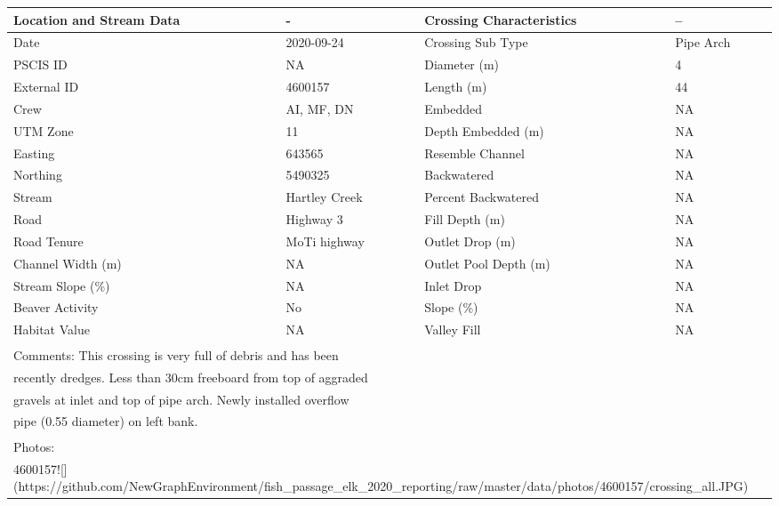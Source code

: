 \documentclass[
]{book}
\begin{document}
\begin{tabular}{l|l|l|l}
\hline
Location and Stream Data & - & Crossing Characteristics & --\\
\hline
Date & 2020-09-24 & Crossing Sub Type & Pipe Arch\\
\hline
PSCIS ID & NA & Diameter (m) & 4\\
\hline
External ID & 4600157 & Length (m) & 44\\
\hline
Crew & AI, MF, DN & Embedded & NA\\
\hline
UTM Zone & 11 & Depth Embedded (m) & NA\\
\hline
Easting & 643565 & Resemble Channel & NA\\
\hline
Northing & 5490325 & Backwatered & NA\\
\hline
Stream & Hartley Creek & Percent Backwatered & NA\\
\hline
Road & Highway 3 & Fill Depth (m) & NA\\
\hline
Road Tenure & MoTi highway & Outlet Drop (m) & NA\\
\hline
Channel Width (m) & NA & Outlet Pool Depth (m) & NA\\
\hline
Stream Slope (\%) & NA & Inlet Drop & NA\\
\hline
Beaver Activity & No & Slope (\%) & NA\\
\hline
Habitat Value & NA & Valley Fill & NA\\
\hline
\multicolumn{4}{l}{\textsuperscript{} Comments: This crossing is very full of debris and has been}\\
\multicolumn{4}{l}{recently dredges.  Less than 30cm freeboard from top of aggraded}\\
\multicolumn{4}{l}{gravels at inlet and top of pipe arch.  Newly installed overflow}\\
\multicolumn{4}{l}{pipe (0.55 diameter) on left bank.}\\
\multicolumn{4}{l}{\textsuperscript{} Photos:}\\
\multicolumn{4}{l}{4600157![](https://github.com/NewGraphEnvironment/fish\_passage\_elk\_2020\_reporting/raw/master/data/photos/4600157/crossing\_all.JPG)}\\
\end{tabular}
\end{document}
